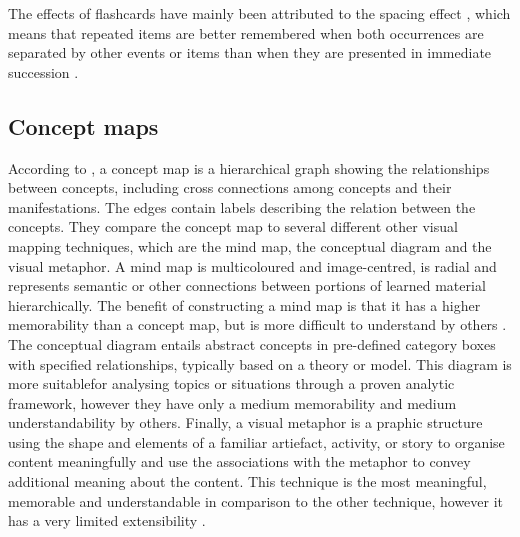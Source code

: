 The effects of flashcards have mainly been attributed to the spacing effect \cite{nakata, microlearning}, which means that repeated items are better remembered when both occurrences are separated by other events or items than when they are presented in immediate succession \cite{verkoeijen, logan, siegel, xue, karpicke2}.

\subsection{Concept maps}

According to , a concept map is a hierarchical graph showing the relationships between concepts, including cross connections among concepts and their manifestations. The edges contain labels describing the relation between the concepts. They compare the concept map to several different other visual mapping techniques, which are the mind map, the conceptual diagram and the visual metaphor. A mind map is multicoloured and image-centred, is radial and represents semantic or other connections between portions of learned material hierarchically. The benefit of constructing a mind map is that it has a higher memorability than a concept map, but is more difficult to understand by others \cite{eppler}. The conceptual diagram entails abstract concepts in pre-defined category boxes with specified relationships, typically based on a theory or model. This diagram is more suitablefor analysing topics or situations through a proven analytic framework, however they have only a medium memorability and medium understandability by others. Finally, a visual metaphor is a praphic structure using the shape and elements of a familiar artiefact, activity, or story to organise content meaningfully and use the associations with the metaphor to convey additional meaning about the content. This technique is the most meaningful, memorable and understandable in comparison to the other technique, however it has a very limited extensibility \cite{eppler}.

